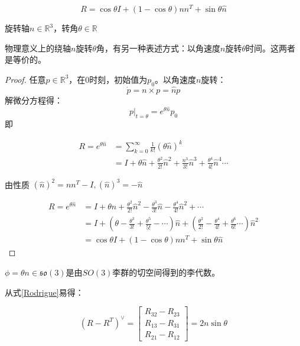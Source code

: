   \begin{equation}
    R=\cos \theta I+(1- \cos \theta)nn^T+\sin\theta \widehat n
    \label{Rodrigue}
  \end{equation}

  旋转轴$n \in \mathbb{R}^{3}$，转角$\theta \in \mathbb{R}$

  物理意义上的绕轴$n$旋转$\theta$角，有另一种表述方式：以角速度$n$旋转$\theta$时间。这两者是等价的。
  \begin{proof}

    任意$p \in \mathbb{R}^{3}$，在0时刻，初始值为$p_0$。以角速度$n$旋转：
    $$\dot p=n \times p=\widehat n p$$
    解微分方程得：
    $$p|_{t=\theta}=e^{\theta \widehat n} p_0$$
    即

    $$\begin{aligned}R=e^{\theta \widehat n}&=\sum_{k=0}^\infty \frac{1}{k!}(\theta \widehat n)^k\\
      & =I+\theta \widehat n+\frac{\theta^2}{2 !} \widehat{n}^2+\frac{n^3}{3 !} \widehat{n}^3+\frac{\theta^4}{4 !} \widehat{n}^4\cdots \end{aligned}      $$

    由性质 $(\widehat n)^2=nn^T-I,(\widehat n)^3=-\widehat n$

      $$\begin{aligned}R=e^{\theta \widehat n}&=
      I+\theta \widehat{n}+\frac{\theta^2}{2 !} \widehat{n}^2-\frac{\theta^3}{3 !} \widehat{n}-\frac{\theta^4}{4 !} \widehat{n}^2+\cdots \\
      & =I+\left(\theta-\frac{\theta^3}{3 !}+\frac{\theta^5}{5 !}-\cdots\right) \widehat{n}+\left(\frac{\theta^2}{2 !}-\frac{\theta^4}{4 !}+\frac{\theta^6}{6 !} \cdots\right) \widehat{n}^2 \\
      &=\cos \theta I+(1- \cos \theta)nn^T+\sin\theta \widehat n
      \end{aligned}      $$

  \end{proof}

  $\phi=\theta n \in \mathfrak{so}(3)$是由$SO(3)$李群的切空间得到的李代数\cite{Liegroup}。

  从式\ref{Rodrigue}易得：

\begin{equation}
  (R-R^T)^\vee=\begin{bmatrix}
    R_{32}-R_{23} \\
    R_{13}-R_{31} \\
    R_{21}-R_{12}
    \end{bmatrix}=2 n \sin\theta
    \label{error}
\end{equation}

